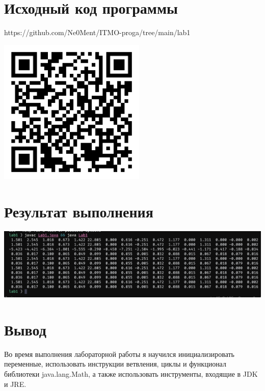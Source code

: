 \documentclass[12pt,onecolumn]{article}
\begin{document}
\section{Исходный код программы}
https://github.com/Ne0Ment/ITMO-proga/tree/main/lab1
\begin{center}
  \includegraphics[width=7cm]{lab1QR.png}
\end{center}


\section{Результат выполнения}
\includegraphics[width=\columnwidth]{result.png}

\section{Вывод}
Во время выполнения лабораторной работы я научился инициализировать переменные, использовать инструкции ветвления, циклы и функционал библиотеки java.lang.Math, а также использовать инструменты, входящие в JDK и JRE.
\end{document}
